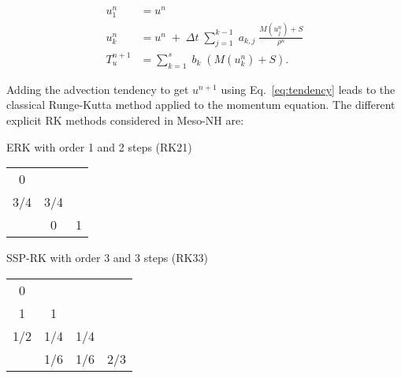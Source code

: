 \begin{align} 
u^{n}_{1} &=  u^{n} \nonumber \\ 
u^{n}_{k} &=  u^{n} \; + \; \Delta{t} \; \sum_{j=1}^{k-1} \; a_{k,j} \; \frac{M(u^n_j)+S}{\rho^n} \label{eq:erk}\\ 
T_u^{n+1} &= \sum_{k=1}^{s} \; b_{k} \; \left( M(u^{n}_{k}) + S \right). \nonumber
\end{align}


Adding the advection tendency to get $u^{n+1}$ using Eq.~\eqref{eq:tendency} leads to the classical Runge-Kutta method applied to the momentum equation. The different explicit RK methods considered in Meso-NH are:
\begin{multicols}{2}
    \begin{center}
        ERK with order 1 and 2 steps (RK21) \\
        \begin{tabular}{c|cc}
            0    & & \\
            3/4  & 3/4 & \\
            \hline
            & 0 & 1 \\		
        \end{tabular}
    \end{center}
    \begin{center}
        SSP-RK with order 3 and 3 steps (RK33) \\
        \begin{tabular}{c|ccc}
            0   & & & \\
            1   & 1 & & \\
            1/2 & 1/4  & 1/4 &  \\
            \hline
            & 1/6 & 1/6 & 2/3 \\		
        \end{tabular}
    \end{center}
\end{multicols}

